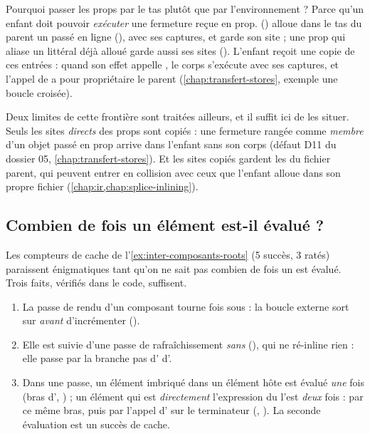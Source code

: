 Pourquoi passer les props par le tas plutôt que par l'environnement ? Parce qu'un enfant doit
pouvoir \emph{exécuter} une fermeture reçue en prop. 
() alloue dans le tas du parent un
 passé en ligne (), avec ses captures, et garde
son site ; une prop qui aliase un littéral déjà alloué garde aussi ses sites
(). L'enfant reçoit une copie de ces entrées : quand son effet appelle
, le corps s'exécute avec ses captures, et l'appel de  a pour
propriétaire le parent (\cref{chap:transfert-stores}, exemple \og une boucle croisée\fg).

Deux limites de cette frontière sont traitées ailleurs, et il suffit ici de les situer. Seuls
les sites \emph{directs} des props sont copiés : une fermeture rangée comme \emph{membre} d'un
objet passé en prop arrive dans l'enfant sans son corps (défaut D11 du dossier 05,
\cref{chap:transfert-stores}). Et les sites copiés gardent les  du fichier parent,
qui peuvent entrer en collision avec ceux que l'enfant alloue dans son propre fichier
(\cref{chap:ir,chap:splice-inlining}).

\subsection{Combien de fois un élément est-il évalué ?}
\label{sec:inter-composants-evaluations}

Les compteurs de cache de l'\cref{ex:inter-composants-roots} (5 succès, 3 ratés) paraissent
énigmatiques tant qu'on ne sait pas combien de fois un  est évalué. Trois faits,
vérifiés dans le code, suffisent.

\begin{enumerate}
  \item La passe de rendu d'un composant tourne  fois sous
         : la boucle externe sort sur 
        \emph{avant} d'incrémenter  ().
  \item Elle est suivie d'une passe de rafraîchissement \emph{sans} 
        (), qui ne ré-inline rien : elle passe par la
        branche \og pas d'\fg{} d'.
  \item Dans une passe, un élément imbriqué dans un élément hôte est évalué \emph{une} fois
        (bras  d',
        ) ; un élément qui est
        \emph{directement} l'expression du  l'est \emph{deux} fois : par ce même
        bras, puis par l'appel d' sur le terminateur 
        (,
        ). La seconde évaluation est un succès de
        cache.
\end{enumerate}

